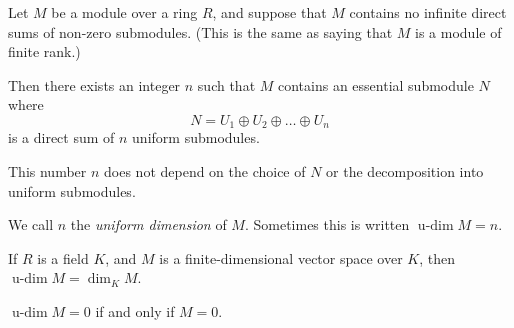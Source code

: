 \documentclass[12pt]{article}
\newcommand{\udim}{\operatorname{u-dim}}
\begin{document}
Let $M$ be a module over a ring $R$, and suppose that $M$ contains no infinite direct sums of non-zero submodules. (This is the same as saying that $M$ is a module of finite rank.)

Then there exists an integer $n$ such that $M$ contains an essential submodule $N$ where $$N = U_1 \oplus U_2 \oplus \dots \oplus U_n$$
is a direct sum of $n$ uniform submodules.

This number $n$ does not depend on the choice of $N$ or the decomposition into uniform submodules.

We call $n$ the \emph{uniform dimension} of $M$.  Sometimes this is written $\udim M = n$.

If $R$ is a field $K$, and $M$ is a finite-dimensional vector space over $K$, then $\udim M = \dim_KM$.

$\udim M = 0$ if and only if $M = 0$.
\end{document}
